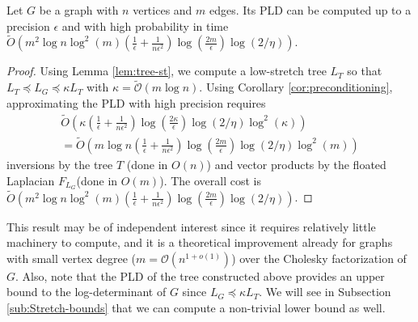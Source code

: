 \begin{theorem} \label{thm:PLD-tree}Let $G$ be a graph with $n$
vertices and $m$ edges. Its PLD can be computed up to a precision
$\epsilon$ and with high probability in time $\tilde{O}\left(m^{2}\log n\log^{2}\left(m\right)\left(\frac{1}{\epsilon}+\frac{1}{n\epsilon^{2}}\right)\log\left(\frac{2m}{\epsilon}\right)\log\left(2/\eta\right)\right)$.\end{theorem}

\begin{proof} Using Lemma \eqref{lem:tree-st}, we compute a low-stretch
tree $L_{T}$ so that $L_{T}\preceq L_{G}\preceq\kappa L_{T}$ with
$\kappa=\tilde{\mathcal{O}}\left(m\log n\right)$. Using Corollary
\eqref{cor:preconditioning}, approximating the PLD with high precision
requires 
\begin{eqnarray*}
\tilde{O}\left(\kappa\left(\frac{1}{\epsilon}+\frac{1}{n\epsilon^{2}}\right)\log\left(\frac{2\kappa}{\epsilon}\right)\log\left(2/\eta\right)\log^{2}\left(\kappa\right)\right)\\
=\tilde{O}\left(m\log n\left(\frac{1}{\epsilon}+\frac{1}{n\epsilon^{2}}\right)\log\left(\frac{2m}{\epsilon}\right)\log\left(2/\eta\right)\log^{2}\left(m\right)\right)
\end{eqnarray*}
 inversions by the tree $T$ (done in $O\left(n\right)$) and vector
products by the floated Laplacian $F_{L_{G}}$(done in $O\left(m\right)$).
The overall cost is $\tilde{O}\left(m^{2}\log n\log^{2}\left(m\right)\left(\frac{1}{\epsilon}+\frac{1}{n\epsilon^{2}}\right)\log\left(\frac{2m}{\epsilon}\right)\log\left(2/\eta\right)\right)$.
\end{proof}

This result may be of independent interest since it requires relatively
little machinery to compute, and it is a theoretical improvement already
for graphs with small vertex degree ($m=\mathcal{O}\left(n^{1+o\left(1\right)}\right)$)
over the Cholesky factorization of $G$. Also, note that the PLD of
the tree constructed above provides an upper bound to the log-determinant
of $G$ since $L_{G}\preceq\kappa L_{T}$. We will see in Subsection
\ref{sub:Stretch-bounds} that we can compute a non-trivial lower
bound as well. 
